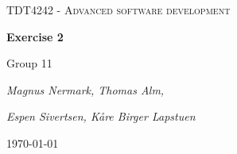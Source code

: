 \documentclass{article}
\begin{document}
\begin{titlepage}
	\centering
	{\scshape\huge TDT4242 - Advanced software development\par}
	\vspace{1.5cm}
	{\huge\bfseries Exercise 2\par}
	\vspace{2cm}
	{\Large Group 11\par}
	{\Large\itshape Magnus Nermark, Thomas Alm,\par}
	{\Large\itshape Espen Sivertsen, Kåre Birger Lapstuen\par}


	\vfill
	


	{\large \today\par}
\end{titlepage}
\tableofcontents
\newpage




\end{document}
